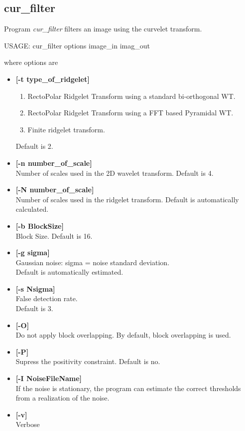\subsection{cur\_filter}

Program {\em cur\_filter} filters an image using the curvelet transform.
\begin{center}
 USAGE:  cur\_filter options image\_in imag\_out
\end{center}
where options are 
\begin{itemize}
\baselineskip=0.4truecm
\itemsep=0.1truecm
\item {\bf [-t type\_of\_ridgelet]} 
\begin{enumerate}
\baselineskip=0.4truecm
\itemsep=0.1truecm
\item RectoPolar Ridgelet Transform using a standard bi-orthogonal WT.
\item RectoPolar Ridgelet Transform using a FFT based Pyramidal WT.
\item Finite ridgelet transform.
\end{enumerate}
Default is 2.
\item {\bf [-n number\_of\_scale]} \\
 Number of scales used in the 2D wavelet transform.
 Default is 4. 

\item {\bf [-N number\_of\_scale]} \\
 Number of scales used in the ridgelet transform.
 Default is automatically calculated.

\item {\bf [-b BlockSize]}  \\
Block Size. Default is 16.

\item {\bf [-g sigma]} \\
Gaussian noise: sigma = noise standard deviation.  \\
 Default is automatically estimated.

\item {\bf [-s Nsigma]} \\
False detection rate. \\
Default is 3.

\item {\bf [-O]}  \\
Do not apply block overlapping. By default, block overlapping is used.

\item {\bf [-P]}  \\
 Supress the positivity constraint. Default is no. 

\item {\bf [-I NoiseFileName]}  \\
If the noise is stationary, the program can estimate the correct 
thresholds from a realization of the noise.

\item {\bf [-v]} \\
Verbose
\end{itemize}

